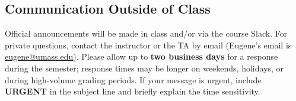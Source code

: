 \documentclass[11pt]{article}
\newcommand{\link}[2]{\href{#1}{\uline{#2}}}
\begin{document}
\subsection*{Communication Outside of Class}
Official announcements will be made in class and/or via the course Slack. For private questions, contact the instructor or the TA by email (Eugene's email is \link{mailto:eugene@umass.edu}{eugene@umass.edu}). Please allow up to \textbf{two business days} for a response during the semester; response times may be longer on weekends, holidays, or during high-volume grading periods. If your message is urgent, include \textbf{URGENT} in the subject line and briefly explain the time sensitivity.
\end{document}
